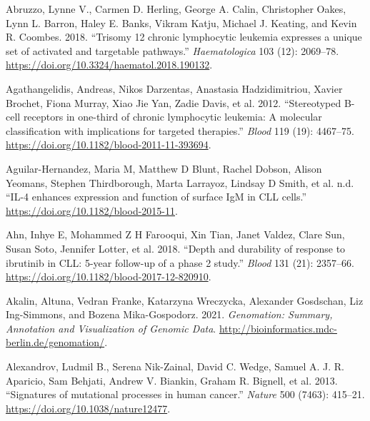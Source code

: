 \documentclass[11pt, a4paper, twosided]{book}
\newenvironment{CSLReferences}%
  {}%
  {\par}
\begin{document}
\noindent

\setlength{\parindent}{-0.5cm}
\setlength{\leftskip}{0.5cm}
\setlength{\parskip}{8pt}

\hypertarget{refs}{}
\begin{CSLReferences}{1}{0}
\leavevmode{}%
Abruzzo, Lynne V., Carmen D. Herling, George A. Calin, Christopher Oakes, Lynn L. Barron, Haley E. Banks, Vikram Katju, Michael J. Keating, and Kevin R. Coombes. 2018. {``{Trisomy 12 chronic lymphocytic leukemia expresses a unique set of activated and targetable pathways}.''} \emph{Haematologica} 103 (12): 2069--78. \url{https://doi.org/10.3324/haematol.2018.190132}.

\leavevmode{}%
Agathangelidis, Andreas, Nikos Darzentas, Anastasia Hadzidimitriou, Xavier Brochet, Fiona Murray, Xiao Jie Yan, Zadie Davis, et al. 2012. {``{Stereotyped B-cell receptors in one-third of chronic lymphocytic leukemia: A molecular classification with implications for targeted therapies}.''} \emph{Blood} 119 (19): 4467--75. \url{https://doi.org/10.1182/blood-2011-11-393694}.

\leavevmode{}%
Aguilar-Hernandez, Maria M, Matthew D Blunt, Rachel Dobson, Alison Yeomans, Stephen Thirdborough, Marta Larrayoz, Lindsay D Smith, et al. n.d. {``{IL-4 enhances expression and function of surface IgM in CLL cells}.''} \url{https://doi.org/10.1182/blood-2015-11}.

\leavevmode{}%
Ahn, Inhye E, Mohammed Z H Farooqui, Xin Tian, Janet Valdez, Clare Sun, Susan Soto, Jennifer Lotter, et al. 2018. {``{Depth and durability of response to ibrutinib in CLL: 5-year follow-up of a phase 2 study.}''} \emph{Blood} 131 (21): 2357--66. \url{https://doi.org/10.1182/blood-2017-12-820910}.

\leavevmode{}%
Akalin, Altuna, Vedran Franke, Katarzyna Wreczycka, Alexander Gosdschan, Liz Ing-Simmons, and Bozena Mika-Gospodorz. 2021. \emph{Genomation: Summary, Annotation and Visualization of Genomic Data}. \url{http://bioinformatics.mdc-berlin.de/genomation/}.

\leavevmode{}%
Alexandrov, Ludmil B., Serena Nik-Zainal, David C. Wedge, Samuel A. J. R. Aparicio, Sam Behjati, Andrew V. Biankin, Graham R. Bignell, et al. 2013. {``{Signatures of mutational processes in human cancer}.''} \emph{Nature} 500 (7463): 415--21. \url{https://doi.org/10.1038/nature12477}.


\end{CSLReferences}
\end{document}

